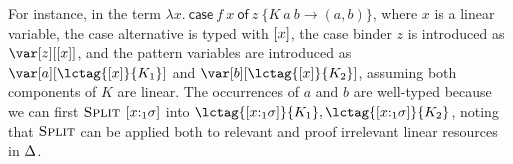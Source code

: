 \documentclass[acmsmall,review,anonymous,screen]{acmart}
\newcommand{\ccase}[2]{\mathsf{case}~#1~\mathsf{of}~#2}
\begin{document}
For instance, in the term $\lambda x.~\ccase{f~x}{z~\{K~a~b\to
  (a,b)\}}$, where $x$ is a linear variable, the case alternative is
typed with $\left[x\right]$,
the case binder $z$ is introduced as $\z[\irr{x}]$, and the pattern variables
are introduced as $\var[a][\lctag{\irr{x}}{K_1}]$ and
$\var[b][\lctag{\irr{x}}{K_2}]$, assuming both components of $K$ are linear.
%
The occurrences of $a$ and $b$ are well-typed because we can first
$\textsc{Split}$ $[x{:}_1\sigma]$ into $\lctag{[x{:}_1\s]}{K_1}, \lctag{[x{:}_1\s]}{K_2}$,
%
%
noting that $\textsc{Split}$ can be applied both to relevant and proof irrelevant linear
resources in $\Delta$.

\end{document}
